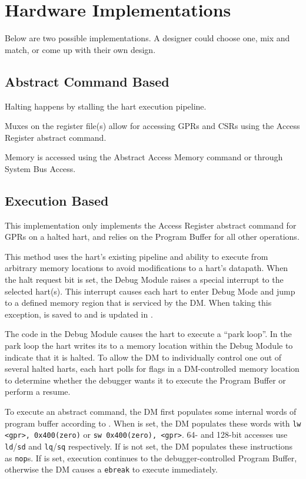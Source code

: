 \chapter{Hardware Implementations}
\label{sec:implementations}

Below are two possible implementations. A designer could choose one, mix and
match, or come up with their own design.

\section{Abstract Command Based}

Halting happens by stalling the hart execution pipeline.

Muxes on the register file(s) allow for accessing GPRs and CSRs
using the Access Register abstract command.

Memory is accessed using the Abstract Access Memory command or through System
Bus Access.

\section{Execution Based}

This implementation only implements the Access Register abstract command
for GPRs on a halted hart, and relies on the Program Buffer for all other
operations.

This method uses the hart's existing pipeline
and ability to execute from arbitrary memory locations to avoid
modifications to a hart's datapath.
When the halt request bit is set, the Debug Module raises a special interrupt
to the selected hart(s). This interrupt causes each
hart to enter Debug Mode and jump to a defined
memory region that is serviced by the DM.
When taking this exception, \Rpc is saved to \Rdpc and \Fcause is updated
in \Rdcsr.

The code in the Debug Module causes the hart to execute a ``park loop''.
In the park loop the hart writes its \Rmhartid to a
memory location within the Debug Module to indicate that it is halted.
To allow the DM to individually control one out of several
halted harts, each hart polls for flags in a DM-controlled memory location
to determine whether the debugger wants it to
execute the Program Buffer or perform a resume.

To execute an abstract command, the DM first populates some internal words of
program buffer according to \Rcommand. When \Ftransfer is set, the DM
populates these words with {\tt lw <gpr>, 0x400(zero)} or {\tt sw 0x400(zero), <gpr>}.
64- and 128-bit accesses use {\tt ld}/{\tt sd} and {\tt lq}/{\tt sq}
respectively. If \Ftransfer is not set, the DM populates these instructions as {\tt nop}s.
If \Fexecute is set, execution continues to the debugger-controlled Program Buffer,
otherwise the DM causes a {\tt ebreak} to execute immediately.

